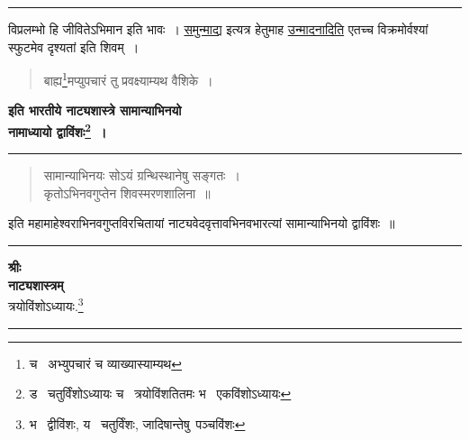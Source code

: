 \documentclass[11pt, openany]{book}
\begin{document}
\hrule

\noindent
विप्रलम्भो हि जीवितेऽभिमान इति भावः~। \underline{समुन्माद्य} इत्यत्र हेतुमाह \underline{उन्मादनादिति} एतच्च विक्रमोर्वश्यां स्फुटमेव दृश्यतां इति शिवम्~।

\newpage

\begin{quote}
{\na बाह्य\renewcommand{\thefootnote}{1}\footnote{च \textendash\  अभ्युपचारं च व्याख्यास्याम्यथ}मप्युपचारं तु प्रवक्ष्याम्यथ वैशिके~।}
\end{quote}

\begin{center}
\textbf{इति भारतीये नाट्यशास्त्रे सामान्याभिनयो}\\
\textbf{नामाध्यायो द्वाविंशः\renewcommand{\thefootnote}{2}\footnote{ड \textendash\  चतुर्विंशोऽध्यायः च \textendash\  त्रयोविंशतितमः भ \textendash\  एकविंशोऽध्यायः}~।}
\end{center}

\hrule

\begin{quote}
{\qt सामान्याभिनयः सोऽयं ग्रन्थिस्थानेषु सङ्गतः~।\\
कृतोऽभिनवगुप्तेन शिवस्मरणशालिना~॥}
\end{quote}

\begin{center}
इति महामाहेश्वराभिनवगुप्तविरचितायां नाट्यवेदवृत्तावभिनवभारत्यां सामान्याभिनयो द्वाविंशः~॥\\

\vspace{4cm}
\rule{0.2\linewidth}{0.5pt}
\end{center}

\newpage
\thispagestyle{empty}

\begin{center}
\textbf{\large श्रीः}\\

\vspace{2mm}
\textbf{\huge नाट्यशास्त्रम्}\\

\vspace{2mm}
त्रयोविंशोऽध्यायः.\renewcommand{\thefootnote}{1}\footnote{भ \textendash\  द्वीविंशः, य \textendash\  चतुर्विंशः, जादिषान्तेषु\textendash\ पञ्चविंशः}\\

\rule{0.2\linewidth}{0.5pt}
\end{center}
\end{document}
